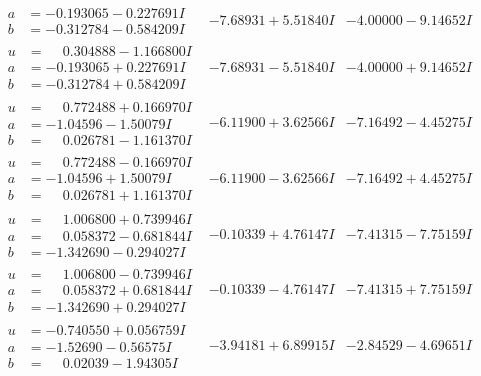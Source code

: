 \documentclass[1p]{elsarticle_modified}
\theoremstyle{definition}
\begin{document}
$$\begin{array}{c|c|c}
\begin{aligned}
a &= -0.193065 - 0.227691 I \\
b &= -0.312784 - 0.584209 I\end{aligned}
 & -7.68931 + 5.51840 I & -4.00000 - 9.14652 I \\ \hline\begin{aligned}
u &= \phantom{-}0.304888 - 1.166800 I \\
a &= -0.193065 + 0.227691 I \\
b &= -0.312784 + 0.584209 I\end{aligned}
 & -7.68931 - 5.51840 I & -4.00000 + 9.14652 I \\ \hline\begin{aligned}
u &= \phantom{-}0.772488 + 0.166970 I \\
a &= -1.04596 - 1.50079 I \\
b &= \phantom{-}0.026781 - 1.161370 I\end{aligned}
 & -6.11900 + 3.62566 I & -7.16492 - 4.45275 I \\ \hline\begin{aligned}
u &= \phantom{-}0.772488 - 0.166970 I \\
a &= -1.04596 + 1.50079 I \\
b &= \phantom{-}0.026781 + 1.161370 I\end{aligned}
 & -6.11900 - 3.62566 I & -7.16492 + 4.45275 I \\ \hline\begin{aligned}
u &= \phantom{-}1.006800 + 0.739946 I \\
a &= \phantom{-}0.058372 - 0.681844 I \\
b &= -1.342690 - 0.294027 I\end{aligned}
 & -0.10339 + 4.76147 I & -7.41315 - 7.75159 I \\ \hline\begin{aligned}
u &= \phantom{-}1.006800 - 0.739946 I \\
a &= \phantom{-}0.058372 + 0.681844 I \\
b &= -1.342690 + 0.294027 I\end{aligned}
 & -0.10339 - 4.76147 I & -7.41315 + 7.75159 I \\ \hline\begin{aligned}
u &= -0.740550 + 0.056759 I \\
a &= -1.52690 - 0.56575 I \\
b &= \phantom{-}0.02039 - 1.94305 I\end{aligned}
 & -3.94181 + 6.89915 I & -2.84529 - 4.69651 I \\ \hline\begin{aligned}

\end{aligned}
\end{array}$$
\end{document}

